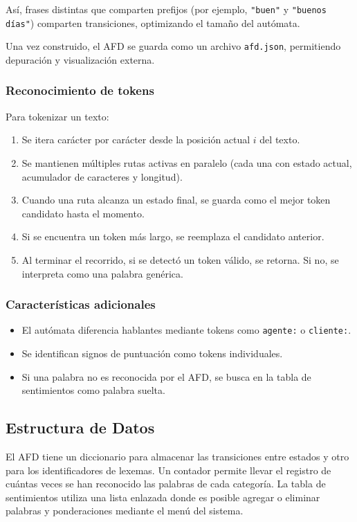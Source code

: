 Así, frases distintas que comparten prefijos (por ejemplo, \texttt{"buen"} y \texttt{"buenos
	días"}) comparten transiciones, optimizando el tamaño del autómata.

Una vez construido, el AFD se guarda como un archivo \texttt{afd.json}, permitiendo depuración
y visualización externa.

\subsubsection{Reconocimiento de tokens}

Para tokenizar un texto:
\begin{enumerate}
	\item Se itera carácter por carácter desde la posición actual $i$ del texto.
	\item Se mantienen múltiples rutas activas en paralelo (cada una con estado actual, acumulador de caracteres y longitud).
	\item Cuando una ruta alcanza un estado final, se guarda como el mejor token candidato hasta el momento.
	\item Si se encuentra un token más largo, se reemplaza el candidato anterior.
	\item Al terminar el recorrido, si se detectó un token válido, se retorna. Si no, se interpreta como una palabra genérica.
\end{enumerate}

\subsubsection{Características adicionales}

\begin{itemize}
	\item El autómata diferencia hablantes mediante tokens como \texttt{agente:} o \texttt{cliente:}.
	\item Se identifican signos de puntuación como tokens individuales.
	\item Si una palabra no es reconocida por el AFD, se busca en la tabla de sentimientos como palabra suelta.
\end{itemize}

\subsection{Estructura de Datos}
El AFD tiene un diccionario para almacenar las transiciones entre estados y otro para los
identificadores de lexemas. Un contador permite llevar el registro de cuántas veces se han
reconocido las palabras de cada categoría. La tabla de sentimientos utiliza una lista enlazada
donde es posible agregar o eliminar palabras y ponderaciones mediante el menú del sistema.

